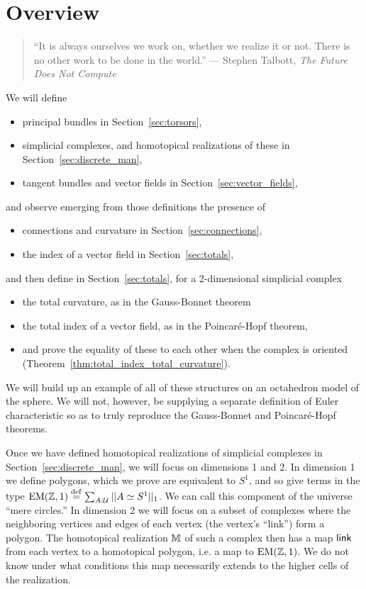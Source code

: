 \section{Overview}

\begin{quote} 
\centering
``It is always ourselves we work on, whether we realize it or not. There is no other work to be done in the world.''
 --- Stephen Talbott, \emph{The Future Does Not Compute}\cite{talbott}
\end{quote}

We will define 
\begin{itemize}
\item principal bundles in Section~\ref{sec:torsors},
\item simplicial complexes, and homotopical realizations of these in Section~\ref{sec:discrete_man},
\item tangent bundles and vector fields in Section~\ref{sec:vector_fields},
\end{itemize}
and observe emerging from those definitions the presence of
\begin{itemize}
\item connections and curvature in Section~\ref{sec:connections},
\item the index of a vector field in Section~\ref{sec:totals},
\end{itemize}
and then define in Section~\ref{sec:totals}, for a 2-dimensional simplicial complex
\begin{itemize}
\item the total curvature, as in the Gauss-Bonnet theorem
\item the total index of a vector field, as in the Poincaré-Hopf theorem,
\item and prove the equality of these to each other when the complex is oriented (Theorem~\ref{thm:total_index_total_curvature}).
\end{itemize}

We will build up an example of all of these structures on an octahedron model of the sphere. We will not, however, be supplying a separate definition of Euler characteristic so as to truly reproduce the Gauss-Bonnet and Poincaré-Hopf theorems.

Once we have defined homotopical realizations of simplicial complexes in Section~\ref{sec:discrete_man}, we will focus on dimensions 1 and 2. In dimension 1 we define polygons, which we prove are equivalent to \( S^1 \), and so give terms in the type \( \mathrm{EM}(\mathbb{Z},1)\stackrel{\mathrm{def}}{=} \sum_{A:\mathcal{U}}||A\simeq S^1||_1 \). We can call this component of the universe ``mere circles.'' In dimension 2 we will focus on a subset of complexes where the neighboring vertices and edges of each vertex (the vertex's ``link'') form a polygon. The homotopical realization \( \mathbb{M} \) of such a complex then has a map \( \operatorname{\mathsf{link}} \) from each vertex to a homotopical polygon, i.e. a map to \( \mathrm{EM}(\mathbb{Z},1) \). We do not know under what conditions this map necessarily extends to the higher cells of the realization.

